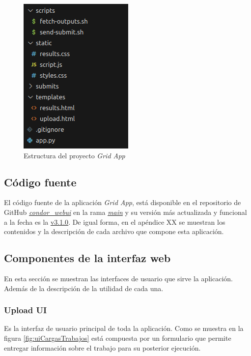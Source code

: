\begin{figure}[H]
	\centering
	\includegraphics[scale=0.35]{tablas-images/pmv/estructura-proyecto-grid-app.png}
	\caption{Estructura del proyecto \textit{Grid App}}
	\label{fig:estructura-proyecto-grid-app}
\end{figure}

\subsection{Código fuente}
\noindent

El código fuente de la aplicación \textit{Grid App}, está disponible en el repositorio de GitHub \href{https://github.com/JuanEstebanOsma1012/condor\_webui}{\textit{condor\_webui}} en la rama \href{https://github.com/JuanEstebanOsma1012/condor\_webui/tree/main}{\textit{main}} y su versión más actualizada y funcional a la fecha es la \href{https://github.com/JuanEstebanOsma1012/condor\_webui/releases/tag/v3.1.0}{v3.1.0}. De igual forma, en el apéndice XX se muestran los contenidos y la descripción de cada archivo que compone esta aplicación.

\subsection{Componentes de la interfaz web}
\noindent
En esta sección se muestran las interfaces de usuario que sirve la aplicación. Además de la descripción de la utilidad de cada una.

\subsubsection{Upload UI}
\noindent
Es la interfaz de usuario principal de toda la aplicación. Como se muestra en la figura \ref{fig:uiCargasTrabajos} está compuesta por un formulario que permite entregar información sobre el trabajo para su posterior ejecución.

